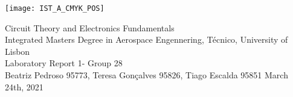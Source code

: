 
\thispagestyle {empty}

\texttt{[image: IST\_A\_CMYK\_POS]}

\begin{center}
%
\vspace{1.0cm}

\vspace{1cm}
{\FontLb Circuit Theory and Electronics Fundamentals} \\ %
\vspace{1cm}
{\FontSn Integrated Masters Degree in Aerospace Engennering, Técnico, University of Lisbon} \\ %
\vspace{1cm}
{\FontSn Laboratory Report 1- Group 28} \\
\vspace{1cm}
{\FontSn Beatriz Pedroso 95773, Teresa Gonçalves 95826, Tiago Escalda 95851}
\vspace{1cm}
{\FontSn March 24th, 2021} \\ %
%
\end{center}

